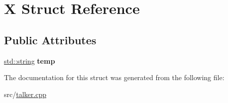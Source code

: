 \hypertarget{struct_x}{}\section{X Struct Reference}
\label{struct_x}
\subsection*{Public Attributes}
\begin{DoxyCompactItemize}
\item 
\hyperlink{talker_8cpp_a0ba76bcac54e80d914f29f0c76d947be}{std\+::string} {\bfseries temp}\hypertarget{struct_x_a08b1cca1250e07bb26e61316d0dd8ac3}{}\label{struct_x_a08b1cca1250e07bb26e61316d0dd8ac3}

\end{DoxyCompactItemize}


The documentation for this struct was generated from the following file\+:\begin{DoxyCompactItemize}
\item 
src/\hyperlink{talker_8cpp}{talker.\+cpp}\end{DoxyCompactItemize}
